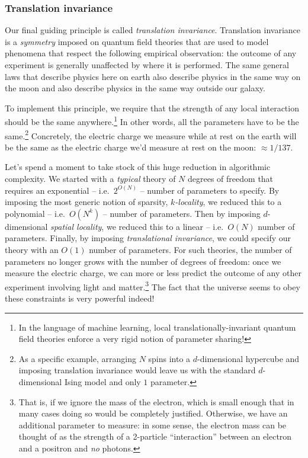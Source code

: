 \documentclass[12pt]{article}
\begin{document}
\subsubsection*{Translation invariance}

Our final guiding principle is called \emph{translation invariance}. Translation invariance is a \emph{symmetry} imposed on 
quantum field theories that are used to model phenomena that respect
the following empirical observation: the outcome of any experiment is generally unaffected by where it is performed. The same general laws that describe physics here on earth also describe physics in the same way on the moon and also describe physics in the same way outside our galaxy. 

To implement this principle, we require that the strength of any local interaction should be the same anywhere.\footnote{In the language of machine learning, local translationally-invariant quantum field theories enforce a very rigid notion of parameter sharing!} In other words, all the parameters have to be the same.\footnote{
    As a specific example, arranging $N$ spins into a $d$-dimensional hypercube and imposing translation invariance would leave us with the standard $d$-dimensional Ising model and only $1$ parameter.
} 
 Concretely, the electric charge we measure while at rest on the earth will be the same as the electric charge we'd measure at rest on the moon: $\approx 1/137$.

Let's spend a moment to take stock of this huge reduction in algorithmic complexity. We started with a \emph{typical} theory of $N$ degrees of freedom that requires an exponential -- i.e.~$2^{O(N)}$ -- number of parameters to specify. By imposing the most generic notion of sparsity, \emph{$k$-locality}, we reduced this to a polynomial -- i.e.~$O(N^k)$ -- number of parameters. Then by imposing $d$-dimensional \emph{spatial locality}, we reduced this to a linear -- i.e.~$O(N)$ number of parameters. Finally, by imposing \emph{translational invariance}, we could specify our theory with an $O(1)$  number of parameters. For such theories, the number of parameters no longer grows with the number of degrees of freedom: once we measure the electric charge, we can more or less predict the outcome of any other experiment involving light and matter.\footnote{That is, if we ignore the mass of the electron, which is small enough that in many cases doing so would be completely justified. Otherwise, we have an additional parameter to measure: in some sense, the electron mass can be thought of as the strength of a 2-particle ``interaction'' between an electron and a positron and \emph{no} photons.\label{footnote:electron-mass}}
The fact that the universe seems to obey these constraints is very powerful indeed!
\end{document}
